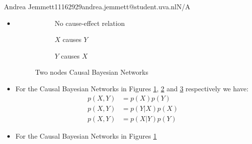 \documentclass{amsmlaj}
\begin{document}
{Andrea Jemmett}{11162929}{andrea.jemmett@student.uva.nl}{N/A}


\begin{problem}
\end{problem}

\begin{problem}
\begin{sol}
	\begin{itemize}
		\item[(a)] \hfill \vspace{-1cm}
			\begin{figure}[h]
				\centering
				\begin{subfigure}[b]{.3\textwidth}
					\centering
					\caption{No cause-effect relation}
					\label{fig:cbn1}
				\end{subfigure}
				\begin{subfigure}[b]{.3\textwidth}
					\centering
					\caption{$X$ causes $Y$}
					\label{fig:cbn2}
				\end{subfigure}
				\begin{subfigure}[b]{.3\textwidth}
					\centering
					\caption{$Y$ causes $X$}
					\label{fig:cbn3}
				\end{subfigure}
				\caption{Two nodes Causal Bayesian Networks}
				\label{fig:cbn}
			\end{figure}
		\item[(b)] For the Causal Bayesian Networks in Figures \ref{fig:cbn1},
			\ref{fig:cbn2} and \ref{fig:cbn3} respectively we have:
			\begin{align}
				p(X,Y) &= p(X)p(Y) \\
				p(X,Y) &= p(Y|X)p(X) \\
				p(X,Y) &= p(X|Y)p(Y)
			\end{align}
		\item[(c)] For the Causal Bayesian Networks in Figures \ref{fig:cbn1}

\end{itemize}
\end{sol}
\end{problem}
\end{document}
